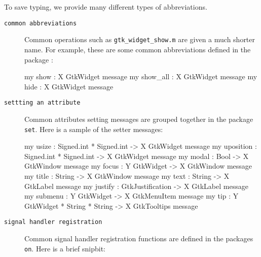 \documentclass{article}
\begin{document}
To save typing, we provide many different types of abbreviations.
\begin{description}
 \item[\tt common abbreviations] Common operations
such as \verb|gtk_widget_show.m| are given a much shorter name.
For example, these are some common abbreviations defined in the
package :
\begin{smldisp}
  my show     : X GtkWidget message
  my show_all : X GtkWidget message
  my hide     : X GtkWidget message
\end{smldisp}
 \item[\tt settting an attribute] Common attributes setting messages
are grouped together in the package \verb|set|.  Here is a sample
of the setter messages:
\begin{smldisp}
   my usize     : Signed.int * Signed.int -> X GtkWidget message
   my uposition : Signed.int * Signed.int -> X GtkWidget message
   my modal     : Bool -> X GtkWindow message
   my focus     : Y GtkWidget -> X GtkWindow message
   my title     : String -> X GtkWindow message
   my text      : String -> X GtkLabel message
   my justify   : GtkJustification -> X GtkLabel message
   my submenu   : Y GtkWidget -> X GtkMenuItem message
   my tip       : Y GtkWidget * String * String -> X GtkTooltips message
\end{smldisp}

 \item[\tt signal handler registration]
Common signal handler registration functions are defined in the 
packages \verb|on|.  Here is a brief snipbit:


\end{description}
\end{document}
